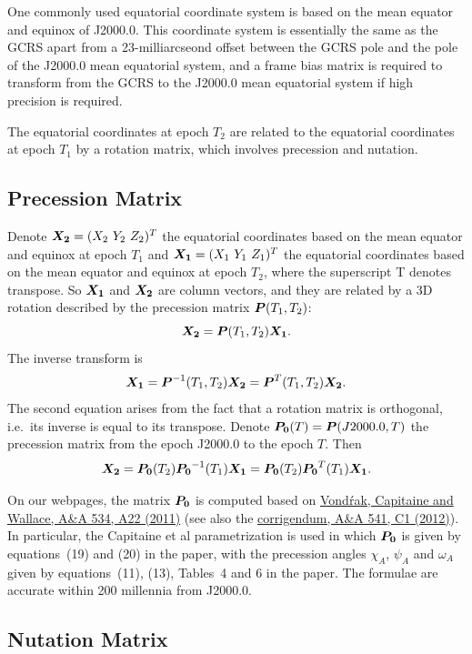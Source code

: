 \documentclass[12pt]{article}
\newcommand \beq {\begin{equation}}
\newcommand \eeq {\end{equation}}
\newcommand{\ve}[1]{\mbox{\boldmath $#1$}}
\begin{document}
One commonly used equatorial coordinate system is based on the mean equator and 
equinox of J2000.0. This coordinate system is essentially the same as the GCRS 
apart from a 23-milliarcseond offset between the GCRS pole and the pole of 
the J2000.0 mean equatorial system, and a frame bias matrix is required to 
transform from the GCRS to the J2000.0 mean equatorial system if high precision
is required.

The equatorial coordinates at epoch $T_2$ are related to the equatorial coordinates 
at epoch $T_1$ by a rotation matrix, which involves precession and nutation. 

\subsection{Precession Matrix}

Denote $\ve{X_2}=(X_2\ Y_2\ Z_2)^T$ the equatorial coordinates based on 
the mean equator and equinox at epoch $T_1$ and $\ve{X_1}=(X_1\ Y_1\ Z_1)^T$ 
the equatorial coordinates based on the mean equator and equinox at epoch $T_2$,
where the superscript T denotes transpose. So $\ve{X_1}$ and $\ve{X_2}$ are column 
vectors, and they are related by a 3D rotation described by the precession matrix 
$\ve{P}(T_1,T_2)$: 
\beq
  \ve{X_2} = \ve{P}(T_1,T_2) \ve{X_1} . 
\eeq
The inverse transform is 
\beq
  \ve{X_1} = \ve{P}^{-1}(T_1,T_2) \ve{X_2} = \ve{P}^T(T_1,T_2) \ve{X_2} .
\eeq
The second equation arises from the fact that a rotation matrix is orthogonal, 
i.e.\ its inverse is equal to its transpose. Denote $\ve{P_0}(T)=\ve{P}(J2000.0,T)$ 
the precession matrix from the epoch J2000.0 to the epoch $T$. Then 
\beq
  \ve{X_2} = \ve{P_0}(T_2)\ve{P_0}^{-1}(T_1) \ve{X_1} = 
\ve{P_0}(T_2) \ve{P_0}^T(T_1) \ve{X_1} .
\eeq

On our webpages, the matrix $\ve{P_0}$ is computed based on 
\href{http://adsabs.harvard.edu/abs/2011A%26A...534A..22V}{Vond\'rak, 
Capitaine and Wallace, A\&A 534, A22 (2011)} (see also the 
\href{https://www.aanda.org/articles/aa/pdf/2012/05/aa17274e-11.pdf}{corrigendum, 
A\&A 541, C1 (2012)}). In particular, the Capitaine et al parametrization is used in which 
$\ve{P_0}$ is given by equations~(19) and (20) in the paper, with the precession 
angles $\chi_A$, $\psi_A$ and $\omega_A$ given by equations~(11), (13), Tables~4 and 6 
in the paper. The formulae are accurate within 200 millennia from J2000.0. 

\subsection{Nutation Matrix} 
\label{sec:nutation}
\end{document}
